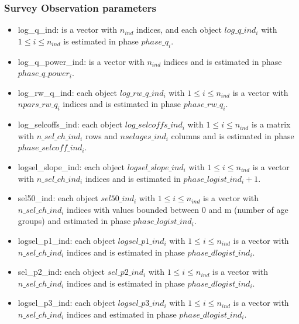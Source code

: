 \documentclass{article}
\begin{document}
\subsubsection{Survey Observation parameters}
\begin{itemize}
     
    \item log\_q\_ind: is a vector with $n_{ind}$ indices, and each object $log\_q\_ind_i$ with $1\leq i \leq n_{ind}$ is estimated in phase $phase\_q_i$. 

     
    \item log\_q\_power\_ind: is a vector with $n_{ind}$ indices and is estimated in phase $phase\_q\_power_i$.

    
    \item log\_rw\_q\_ind: each object $log\_rw\_q\_ind_i$ with $1\leq i \leq n_{ind}$ is a vector with $npars\_rw\_q_i$ indices and is estimated in phase $phase\_rw\_q_i$.

    
    
    \item log\_selcoffs\_ind: each object $log\_selcoffs\_ind_i$ with $1\leq i \leq n_{ind}$ is a matrix with $n\_sel\_ch\_ind_i$ rows and $nselages\_ind_i$ columns and is estimated in phase $phase\_selcoff\_ind_i$.
    
    
     
    \item logsel\_slope\_ind: each object $logsel\_slope\_ind_i$ with $1\leq i \leq n_{ind}$ is a vector with $n\_sel\_ch\_ind_i$ indices and is estimated in $phase\_logist\_ind_i+1$.
    
    
    \item sel50\_ind: each object $sel50\_ind_i$ with $1\leq i \leq n_{ind}$ is a  vector with $n\_sel\_ch\_ind_i$ indices with values bounded between 0 and m (number of age groups) and estimated in phase $phase\_logist\_ind_i$. 
    
     
    \item logsel\_p1\_ind: each object $logsel\_p1\_ind_i$ with $1\leq i \leq n_{ind}$ is a vector with $n\_sel\_ch\_ind_i$ indices and is estimated in phase $phase\_dlogist\_ind_i$.

    
    
    \item sel\_p2\_ind: each object $sel\_p2\_ind_i$  with $1\leq i \leq n_{ind}$ is a vector with $n\_sel\_ch\_ind_i$ indices and is estimated in phase $phase\_dlogist\_ind_i$.
    
     
    \item logsel\_p3\_ind: each object $logsel\_p3\_ind_i$ with $1\leq  i \leq n_{ind}$ is a vector with $n\_sel\_ch\_ind_i$ indices and estimated in phase $phase\_dlogist\_ind_i$.
\end{itemize}
\end{document}
